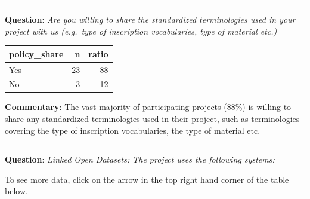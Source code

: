 \documentclass[
  10pt,
]{article}
\begin{document}
\begin{center}\rule{0.5\linewidth}{0.5pt}\end{center}

\textbf{Question}: \emph{Are you willing to share the standardized
terminologies used in your project with us (e.g.~type of inscription
vocabularies, type of material etc.)}

\begin{longtable}[]{@{}lrr@{}}
\toprule
policy\_share & n & ratio \\
\midrule
\endhead
Yes & 23 & 88 \\
No & 3 & 12 \\
\bottomrule
\end{longtable}

\textbf{Commentary}: The vast majority of participating projects (88\%)
is willing to share any standardized terminologies used in their
project, such as terminologies covering the type of inscription
vocabularies, the type of material etc.

\begin{center}\rule{0.5\linewidth}{0.5pt}\end{center}

\textbf{Question}: \emph{Linked Open Datasets: The project uses the
following systems:}

To see more data, click on the arrow in the top right hand corner of the
table below.
\end{document}
